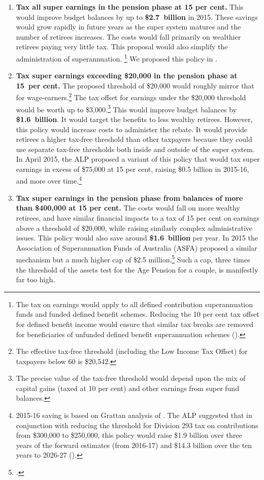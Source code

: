 \begin{enumerate}
\item \textbf{Tax all super earnings in the pension phase at 15 per cent.}  This would improve budget balances by up to \textbf{\$2.7~billion} in 2015. These savings would grow rapidly in future years as the super system matures and the number of retirees increases. The costs would fall primarily on wealthier retirees paying very little tax. This proposal would also simplify the administration of superannuation.%
\footnote{The tax on earnings would apply to all defined contribution superannuation funds and funded defined benefit schemes. Reducing the 10 per cent tax offset for defined benefit income would ensure that similar tax breaks are removed for beneficiaries of unfunded defined benefit superannuation schemes (\textcite{ALP2015FairerSuper}).}  We proposed this policy in . 
%
\item \textbf{Tax super earnings exceeding \$20,000 in the pension phase at 15~per cent.} The proposed threshold of \$20,000 would roughly mirror that for wage-earners.\footnote{The effective tax-free threshold (including the Low Income Tax Offset) for taxpayers below 60 is \$20,542.}  The tax offset for earnings under the \$20,000 threshold would be worth up to \$3,000.\footnote{The precise value of the tax-free threshold would depend upon the mix of capital gains (taxed at 10 per cent) and other earnings from super fund balances.}  This would improve budget balances by \textbf{\$1.6~billion}. It would target the benefits to less wealthy retirees. However, this policy would increase costs to administer the rebate. It would provide retirees a higher tax-free threshold than other taxpayers because they could use separate tax-free thresholds both inside and outside of the super system. In April 2015, the ALP proposed a variant of this policy that would tax super earnings in excess of \$75,000 at 15 per cent, raising \$0.5 billion in 2015-16, and more over time.\footnote{2015-16 saving is based on Grattan analysis of \textcite{ABS2013t}. The ALP suggested that in conjunction with reducing the threshold for Division 293 tax on contributions from \$300,000 to \$250,000, this policy would raise \$1.9 billion over three years of the forward estimates (from 2016-17) and \$14.3 billion over the ten years to 2026-27 (\textcite{ALP2015FairerSuper}).}
%
\item \textbf{Tax super earnings in the pension phase from balances of more than \$400,000 at 15 per cent.} The costs would fall on more wealthy retirees, and have similar financial impacts to a tax of 15 per cent on earnings above a threshold of \$20,000, while raising similarly complex administrative issues. This policy would also save around \textbf{\$1.6~billion} per year. In 2015 the Association of Superannuation Funds of Australia (ASFA) proposed a similar mechanism but a much higher cap of \$2.5 million.\footcite{Clare2015b}  Such a cap, three times the threshold of the assets test for the Age Pension for a couple, is manifestly far too high.%

\end{enumerate}
